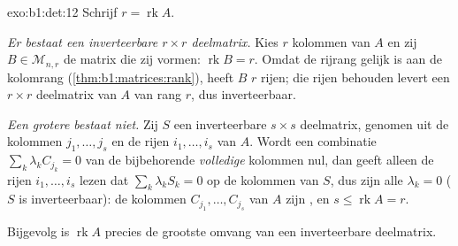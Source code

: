 \begin{solution}{exo:b1:det:12}
Schrijf $r = \operatorname{rk} A$.

\emph{Er bestaat een inverteerbare $r \times r$ deelmatrix.} Kies
$r$  kolommen van $A$ en zij $B \in \mathcal{M}_{n,r}$ de
matrix die zij vormen: $\operatorname{rk} B = r$. Omdat de rijrang
gelijk is aan de kolomrang (\cref{thm:b1:matrices:rank}), heeft $B$
$r$  rijen; die rijen behouden levert een $r \times r$
deelmatrix van $A$ van rang $r$, dus inverteerbaar.

\emph{Een grotere bestaat niet.} Zij $S$ een inverteerbare $s \times
s$ deelmatrix, genomen uit de kolommen $j_1, \dots, j_s$ en de
rijen $i_1, \dots, i_s$ van $A$. Wordt een combinatie $\sum_k
\lambda_k C_{j_k} = 0$ van de bijbehorende \emph{volledige} kolommen
nul, dan geeft alleen de rijen $i_1, \dots, i_s$ lezen dat $\sum_k
\lambda_k S_k = 0$ op de kolommen van $S$, dus zijn alle $\lambda_k
= 0$ ($S$ is inverteerbaar): de kolommen $C_{j_1}, \dots, C_{j_s}$
van $A$ zijn , en $s \leq \operatorname{rk} A = r$.

Bijgevolg is $\operatorname{rk} A$ precies de grootste omvang van een
inverteerbare deelmatrix.
\end{solution}

